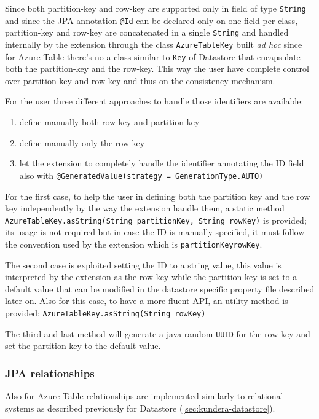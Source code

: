 \noindent Since both partition-key and row-key are supported only in field of type \texttt{String} and since the JPA annotation \texttt{@Id} can be declared only on one field per class, partition-key and row-key are concatenated in a single \texttt{String} and handled internally by the extension through the class \texttt{AzureTableKey} built \textit{ad hoc} since for Azure Table there's no a class similar to \texttt{Key} of Datastore that encapsulate both the partition-key and the row-key.
\noindent This way the user have complete control over partition-key and row-key and thus on the consistency mechanism.

\newparagraph For the user three different approaches to handle those identifiers are available:
\begin{enumerate}
\item define manually both row-key and partition-key
\item define manually only the row-key 
\item let the extension to completely handle the identifier annotating the ID field also with \texttt{@GeneratedValue(strategy = GenerationType.AUTO)}
\end{enumerate}

\noindent For the first case, to help the user in defining both the partition key and the row key independently by the way the extension handle them, a static method \texttt{AzureTableKey.asString(String partitionKey, String rowKey)} is provided; its usage is not required but in case the ID is manually specified, it must follow the convention used by the extension which is \texttt{partitionKey\textunderscore rowKey}.

\noindent The second case is exploited setting the ID to a string value, this value is interpreted by the extension as the row key while the partition key is set to a default value that can be modified in the datastore specific property file described later on. Also for this case, to have a more fluent API, an utility method is provided: \texttt{AzureTableKey.asString(String rowKey)} 

\noindent The third and last method will generate a java random \texttt{UUID} for the row key and set the partition key to the default value.

\subsubsection{JPA relationships}
Also for Azure Table relationships are implemented similarly to relational systems as described previously for Datastore (\ref{sec:kundera-datastore}).

